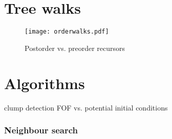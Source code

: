 \section{Tree walks}
\begin{figure}[htbp]
\begin{center}
\texttt{[image: orderwalks.pdf]}
\caption{Postorder vs. preorder recursors}
\label{fig02walks}
\end{center}
\end{figure}



\section{Algorithms}
clump detection
FOF vs. potential
initial conditions


\subsubsection{Neighbour search}

\citep{Barnes:1986p2853}